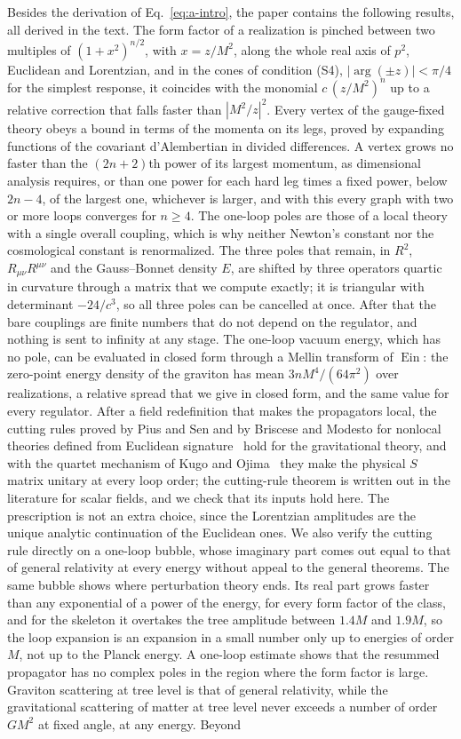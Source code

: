 \documentclass[aps,prd,10pt,twocolumn,superscriptaddress,nofootinbib,floatfix,longbibliography]{revtex4-2}
\newcommand{\Ein}{\operatorname{Ein}}
\begin{document}
Besides the derivation of Eq.~\eqref{eq:a-intro}, the paper contains the following results, all derived in the text. The form factor of a realization is pinched between two multiples of $(1+x^2)^{n/2}$, with $x=z/M^2$, along the whole real axis of $p^2$, Euclidean and Lorentzian, and in the cones of condition (S4), $|\arg(\pm z)|<\pi/4$ for the simplest response, it coincides with the monomial $c\,(z/M^2)^n$ up to a relative correction that falls faster than $|M^2/z|^{2}$. Every vertex of the gauge-fixed theory obeys a bound in terms of the momenta on its legs, proved by expanding functions of the covariant d'Alembertian in divided differences. A vertex grows no faster than the $(2n+2)$th power of its largest momentum, as dimensional analysis requires, or than one power for each hard leg times a fixed power, below $2n-4$, of the largest one, whichever is larger, and with this every graph with two or more loops converges for $n\ge4$. The one-loop poles are those of a local theory with a single overall coupling, which is why neither Newton's constant nor the cosmological constant is renormalized. The three poles that remain, in $R^2$, $R_{\mu\nu}R^{\mu\nu}$ and the Gauss--Bonnet density $E$, are shifted by three operators quartic in curvature through a matrix that we compute exactly; it is triangular with determinant $-24/c^3$, so all three poles can be cancelled at once. After that the bare couplings are finite numbers that do not depend on the regulator, and nothing is sent to infinity at any stage. The one-loop vacuum energy, which has no pole, can be evaluated in closed form through a Mellin transform of $\Ein$: the zero-point energy density of the graviton has mean $3nM^4/(64\pi^2)$ over realizations, a relative spread that we give in closed form, and the same value for every regulator. After a field redefinition that makes the propagators local, the cutting rules proved by Pius and Sen and by Briscese and Modesto for nonlocal theories defined from Euclidean signature~\cite{PiusSen2016,BrisceseModesto2019} hold for the gravitational theory, and with the quartet mechanism of Kugo and Ojima~\cite{KugoOjima1978} they make the physical $S$ matrix unitary at every loop order; the cutting-rule theorem is written out in the literature for scalar fields, and we check that its inputs hold here. The prescription is not an extra choice, since the Lorentzian amplitudes are the unique analytic continuation of the Euclidean ones. We also verify the cutting rule directly on a one-loop bubble, whose imaginary part comes out equal to that of general relativity at every energy without appeal to the general theorems. The same bubble shows where perturbation theory ends. Its real part grows faster than any exponential of a power of the energy, for every form factor of the class, and for the skeleton it overtakes the tree amplitude between $1.4M$ and $1.9M$, so the loop expansion is an expansion in a small number only up to energies of order $M$, not up to the Planck energy. A one-loop estimate shows that the resummed propagator has no complex poles in the region where the form factor is large. Graviton scattering at tree level is that of general relativity, while the gravitational scattering of matter at tree level never exceeds a number of order $GM^2$ at fixed angle, at any energy. Beyond 
\end{document}
